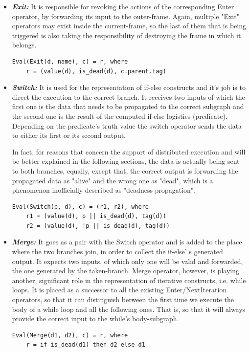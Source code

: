 \documentclass[ack,preface]{dithesis}
\begin{document}
\begin{itemize}
    \item \textit{\textbf{Exit:}} It  is responsible for revoking the actions of the corresponding Enter operator, by forwarding its input to the outer-frame.
 Again, multiple "Exit" operators may exist inside the current-frame, so the last of them that is being triggered is also taking the responsibility of destroying the frame in which it belongs.
\begin{lstlisting}
Eval(Exit(d, name), c) = r, where
	r = (value(d), is_dead(d), c.parent.tag)
\end{lstlisting}

    \item \textit{\textbf{Switch:}} It is used for the representation of if-else constructs and it's job is to direct the execution to the correct branch. It receives two inputs of which the first one is the data that needs to be propagated to the correct subgraph and the second one is the result of the computed if-else logistics  (predicate). Depending on the predicate's truth value the switch operator sends the data to either its first or its second output. 

In fact, for reasons that concern the support of distributed execution and will be better explained in the following sections,  the data is actually being sent to both branches, equally, 
except that, the correct output is forwarding the propagated data as "alive" and the wrong one as "dead", which is a phenomenon inofficially described as "deadness propagation".
\begin{lstlisting}
Eval(Switch(p, d), c) = (r1, r2), where
	r1 = (value(d), p || is_dead(d), tag(d))
	r2 = (value(d), !p || is_dead(d), tag(d))
\end{lstlisting}


    \item \textit{\textbf{Merge:}} It goes as a pair with the Switch operator and is added to the place where the two branches join, in order to collect the if-else' s generated output. It expects two inputs, of which only one will be valid and forwarded, the one generated by the taken-branch. Merge operator, however, is playing another, significant role in the representation of iterative constructs, i.e. while loops. It is placed as a successor to all the existing Enter/NextIteration operators, so that it can distinguish between the first time we execute the body of a while loop and all the following ones. That is, so that  it will always provide the correct input to the while's body-subgraph. 
\begin{lstlisting}
Eval(Merge(d1, d2), c) = r, where
	r = if is_dead(d1) then d2 else d1
\end{lstlisting}

    \end{itemize}
\end{document}

